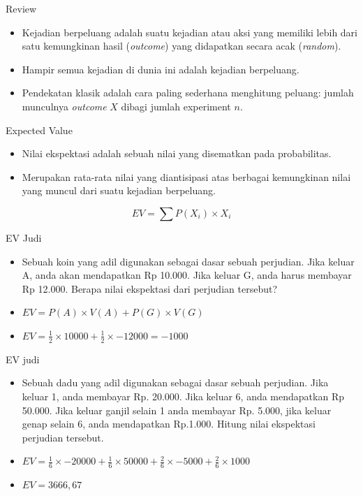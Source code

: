 \documentclass[
  ignorenonframetext,
]{beamer}
\begin{document}
\begin{frame}{Review}
\label{review}
\begin{itemize}
\item
  Kejadian berpeluang adalah suatu kejadian atau aksi yang memiliki
  lebih dari satu kemungkinan hasil (\emph{outcome}) yang didapatkan
  secara acak (\emph{random}).
\item
  Hampir semua kejadian di dunia ini adalah kejadian berpeluang.
\item
  Pendekatan klasik adalah cara paling sederhana menghitung peluang:
  jumlah munculnya \emph{outcome} \(X\) dibagi jumlah experiment \(n\).
\end{itemize}
\end{frame}

\begin{frame}{Expected Value}
\label{expected-value}
\begin{itemize}
\item
  Nilai ekspektasi adalah sebuah nilai yang disematkan pada
  probabilitas.
\item
  Merupakan rata-rata nilai yang diantisipasi atas berbagai kemungkinan
  nilai yang muncul dari suatu kejadian berpeluang.
\end{itemize}

\[
EV=\sum P(X_i) \times X_i
\]
\end{frame}

\begin{frame}{EV Judi}
\label{ev-judi}
\begin{itemize}[<+->]
\item
  Sebuah koin yang adil digunakan sebagai dasar sebuah perjudian. Jika
  keluar A, anda akan mendapatkan Rp 10.000. Jika keluar G, anda harus
  membayar Rp 12.000. Berapa nilai ekspektasi dari perjudian tersebut?
\item
  \(EV=P(A) \times V(A) + P(G) \times V(G)\)
\item
  \(EV=\frac{1}{2} \times 10000 + \frac{1}{2} \times -12000=-1000\)
\end{itemize}
\end{frame}

\begin{frame}{EV judi}
\label{ev-judi-1}
\begin{itemize}
\item
  Sebuah dadu yang adil digunakan sebagai dasar sebuah perjudian. Jika
  keluar 1, anda membayar Rp. 20.000. Jika keluar 6, anda mendapatkan Rp
  50.000. Jika keluar ganjil selain 1 anda membayar Rp. 5.000, jika
  keluar genap selain 6, anda mendapatkan Rp.1.000. Hitung nilai
  ekspektasi perjudian tersebut.
\item
  \(EV=\frac{1}{6} \times -20000 + \frac{1}{6} \times 50000 + \frac{2}{6} \times -5000 + \frac{2}{6}\times 1000\)
\item
  \(EV=3666,67\)
\end{itemize}
\end{frame}
\end{document}
